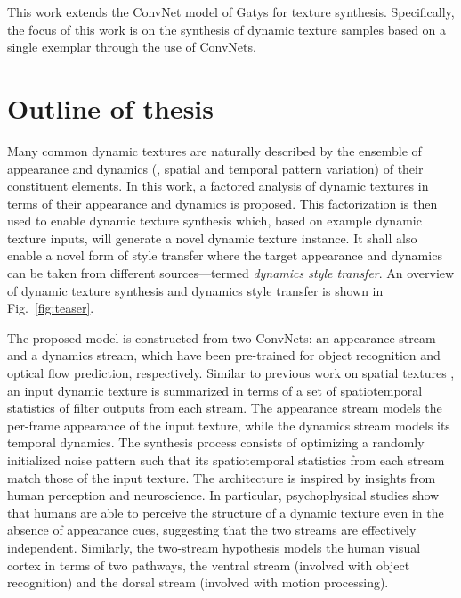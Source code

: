 This work extends the ConvNet model of Gatys \etal \cite{gatys2016image} for texture synthesis. Specifically, the focus of this work is on the synthesis of dynamic texture 
samples based on a single exemplar through the use of ConvNets.

\section{Outline of thesis}

Many common dynamic textures are naturally described by the ensemble of 
appearance and dynamics (\ie, spatial and temporal pattern variation) of their 
constituent elements. In this work, a factored analysis of dynamic 
textures in terms of their appearance and dynamics is proposed.
This factorization is then used to enable dynamic texture synthesis
which, based on example dynamic texture inputs, will generate a novel dynamic
texture instance.
It shall also enable a novel form of style transfer where the 
target appearance and dynamics can be taken from different sources---termed \emph{dynamics style transfer}.
An overview of dynamic texture synthesis and dynamics style transfer
is shown in Fig.\ \ref{fig:teaser}.



The proposed model is constructed from two ConvNets: an appearance stream and a dynamics stream,
which have been pre-trained for object recognition
and optical flow prediction, respectively.
Similar to previous work on spatial textures
\cite{gatys2015,heeger1995pyramid,portilla2000parametric}, an input dynamic texture is summarized in terms of a set of
spatiotemporal statistics of filter outputs from each stream.
The appearance stream models the per-frame appearance of
the input texture, while the dynamics stream models its
temporal dynamics.
The synthesis process consists of optimizing a randomly initialized noise pattern such that its spatiotemporal statistics from
each stream match those of the input texture.
The architecture is inspired by insights from human perception and 
neuroscience.
In particular, psychophysical studies \cite{cutting1982} show that
humans are able to perceive the structure of a dynamic texture even
in the absence of appearance cues, suggesting that the two streams
are effectively independent.
Similarly, the two-stream hypothesis \cite{goodale1992} models the 
human visual cortex in terms of two pathways, the ventral stream
(involved with object recognition) and the
dorsal stream (involved with motion processing).

